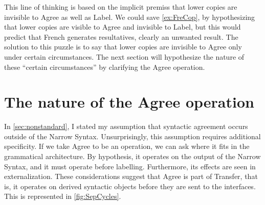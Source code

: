 \documentclass[MilwayThesis]{subfiles}
\begin{document}
This line of thinking is based on the implicit premiss that lower copies are invisible to Agree as well as Label.
We could save \cref{ex:FreCop}, by hypothesizing that lower copies are visible to Agree and invisible to Label, but this would predict that French generates resultatives, clearly an unwanted result.
The solution to this puzzle is to say that lower copies are invisible to Agree only under certain circumstances.
The next section will hypothesize the nature of these ``certain circumstances'' by clarifying the Agree operation.

\section{The nature of the Agree operation}

In \cref{sec:nonstandard}, I stated my assumption that syntactic agreement occurs outside of the Narrow Syntax.
Unsurprisingly, this assumption requires additional specificity.
If we take Agree to be an operation, we can ask where it fits in the grammatical architecture.
By hypothesis, it operates on the output of the Narrow Syntax, and it must operate before labelling.
Furthermore, its effects are seen in externalization.
These considerations suggest that Agree is part of Transfer, that is, it operates on derived syntactic objects before they are sent to the interfaces.
This is represented in \cref{fig:SepCycles}.
%
%
\end{document}
